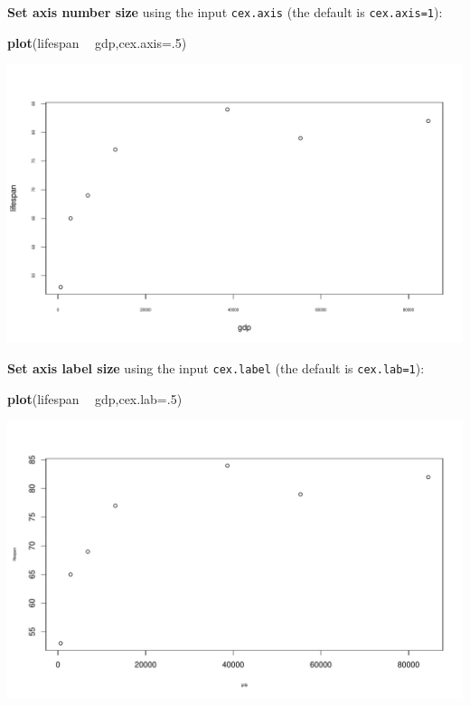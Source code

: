 \documentclass[
]{book}
\newenvironment{Shaded}{\begin{snugshade}}{\end{snugshade}}
\newcommand{\DataTypeTok}[1]{\textcolor[rgb]{0.13,0.29,0.53}{#1}}
\newcommand{\DecValTok}[1]{\textcolor[rgb]{0.00,0.00,0.81}{#1}}
\newcommand{\KeywordTok}[1]{\textcolor[rgb]{0.13,0.29,0.53}{\textbf{#1}}}
\newcommand{\NormalTok}[1]{#1}
\newcommand{\OperatorTok}[1]{\textcolor[rgb]{0.81,0.36,0.00}{\textbf{#1}}}
\newcommand{\StringTok}[1]{\textcolor[rgb]{0.31,0.60,0.02}{#1}}
\begin{document}
\textbf{Set axis number size} using the input \texttt{cex.axis} (the default is \texttt{cex.axis=1}):

\begin{Shaded}
\begin{Highlighting}[]
\KeywordTok{plot}\NormalTok{(lifespan }\OperatorTok{~}\StringTok{ }\NormalTok{gdp,}\DataTypeTok{cex.axis=}\NormalTok{.}\DecValTok{5}\NormalTok{)}
\end{Highlighting}
\end{Shaded}

\includegraphics{figures/unnamed-chunk-110-1.pdf}

\textbf{Set axis label size} using the input \texttt{cex.label} (the default is \texttt{cex.lab=1}):

\begin{Shaded}
\begin{Highlighting}[]
\KeywordTok{plot}\NormalTok{(lifespan }\OperatorTok{~}\StringTok{ }\NormalTok{gdp,}\DataTypeTok{cex.lab=}\NormalTok{.}\DecValTok{5}\NormalTok{)}
\end{Highlighting}
\end{Shaded}

\includegraphics{figures/unnamed-chunk-111-1.pdf}
\end{document}
